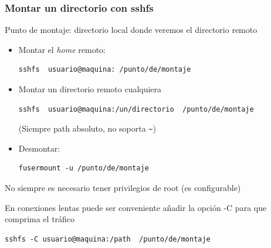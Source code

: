 \documentclass[ucs]{beamer}
\begin{document}
\begin{frame}[fragile]
\frametitle{Montar un directorio con sshfs}
Punto de montaje: directorio local donde veremos el directorio remoto

\begin{itemize}
\item
Montar el \emph{home} remoto:

  \begin{footnotesize}
  \begin{verbatim}
sshfs  usuario@maquina: /punto/de/montaje
  \end{verbatim}
  \end{footnotesize}


\item
Montar un directorio remoto cualquiera


  \begin{footnotesize}
  \begin{verbatim}
sshfs  usuario@maquina:/un/directorio  /punto/de/montaje
  \end{verbatim}
  \end{footnotesize}

(Siempre path absoluto, no soporta \verb|~|)

\item
Desmontar:

  \begin{footnotesize}
  \begin{verbatim}
fusermount -u /punto/de/montaje
  \end{verbatim}
  \end{footnotesize}
\end{itemize}

No siempre es necesario tener privilegios de root (es configurable)

En conexiones lentas puede ser conveniente añadir la opción -C para
que comprima el tráfico

  \begin{footnotesize}
  \begin{verbatim}
sshfs -C usuario@maquina:/path  /punto/de/montaje
  \end{verbatim}
  \end{footnotesize}
\end{frame}
\end{document}
